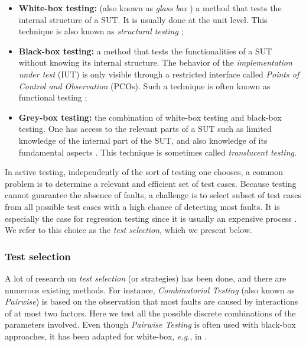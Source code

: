 \begin{itemize}
    \item \textbf{White-box testing:} (also known as \emph{glass box}
        \cite{5733835}) a method that tests the internal
        structure of a SUT. It is usually done at the unit level.
        This technique is also known as \emph{structural testing}
        \cite{5733835};

    \item \textbf{Black-box testing:} a method that tests the
        functionalities of a SUT without knowing its internal
        structure. The behavior of the \textit{implementation
        under test} (IUT) is only visible through a restricted
        interface called \textit{Points of Control and
        Observation} (PCOs). Such a technique is often known as
        functional testing \cite{5733835};

    \item \textbf{Grey-box testing:} the combination of white-box
        testing and black-box testing. One has access to the
        relevant parts of a SUT such as limited knowledge of the
        internal part of the SUT, and also knowledge of its
        fundamental aspects \cite{khan2012comparative}. This
        technique is sometimes called \emph{translucent testing}.
\end{itemize}

In active testing, independently of the sort of testing one
chooses, a common problem is to determine a relevant and
efficient set of test cases. Because testing cannot guarantee the
absence of faults, a challenge is to select subset of test cases
from all possible test cases with a high chance of detecting most
faults.  It is especially the case for regression testing since
it is usually an expensive process
\cite{Rothermel:1997:SER:248233.248262,graves2001empirical}. We
refer to this choice as the \emph{test selection}, which we
present below.

\subsubsection{Test selection}

A lot of research on \textit{test selection} (or strategies) has
been done, and there are numerous existing methods. For
instance, \emph{Combinatorial Testing} (also known as
\emph{Pairwise}) \cite{Tai98atest} is based on the observation
that most faults are caused by interactions of at most two
factors. Here we test all the possible discrete combinations of
the parameters involved. Even though \emph{Pairwise Testing} is
often used with black-box approaches, it has been adapted for
white-box, \emph{e.g.}, in \cite{4385509}.

